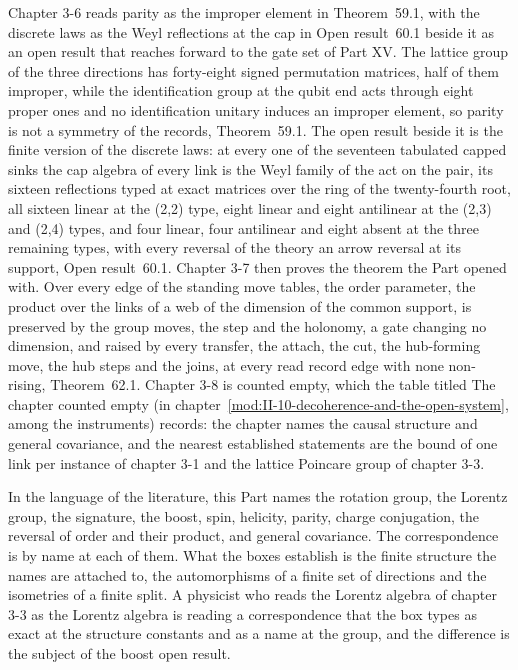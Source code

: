 Chapter 3-6 reads parity as the improper element in Theorem~59.1, with the discrete laws as the Weyl reflections at the cap in Open result~60.1 beside it as an open result that reaches forward to the gate set of Part XV. The lattice group of the three directions has forty-eight signed permutation matrices, half of them improper, while the identification group at the qubit end acts through eight proper ones and no identification unitary induces an improper element, so parity is not a symmetry of the records, Theorem~59.1. The open result beside it is the finite version of the discrete laws: at every one of the seventeen tabulated capped sinks the cap algebra of every link is the Weyl family of the act on the pair, its sixteen reflections typed at exact matrices over the ring of the twenty-fourth root, all sixteen linear at the (2,2) type, eight linear and eight antilinear at the (2,3) and (2,4) types, and four linear, four antilinear and eight absent at the three remaining types, with every reversal of the theory an arrow reversal at its support, Open result~60.1. Chapter 3-7 then proves the theorem the Part opened with. Over every edge of the standing move tables, the order parameter, the product over the links of a web of the dimension of the common support, is preserved by the group moves, the step and the holonomy, a gate changing no dimension, and raised by every transfer, the attach, the cut, the hub-forming move, the hub steps and the joins, at every read record edge with none non-rising, Theorem~62.1. Chapter 3-8 is counted empty, which the table titled The chapter counted empty (in chapter~\ref{mod:II-10-decoherence-and-the-open-system}, among the instruments) records: the chapter names the causal structure and general covariance, and the nearest established statements are the bound of one link per instance of chapter 3-1 and the lattice Poincare group of chapter 3-3.

In the language of the literature, this Part names the rotation group, the Lorentz group, the signature, the boost, spin, helicity, parity, charge conjugation, the reversal of order and their product, and general covariance. The correspondence is by name at each of them. What the boxes establish is the finite structure the names are attached to, the automorphisms of a finite set of directions and the isometries of a finite split. A physicist who reads the Lorentz algebra of chapter 3-3 as the Lorentz algebra is reading a correspondence that the box types as exact at the structure constants and as a name at the group, and the difference is the subject of the boost open result.

